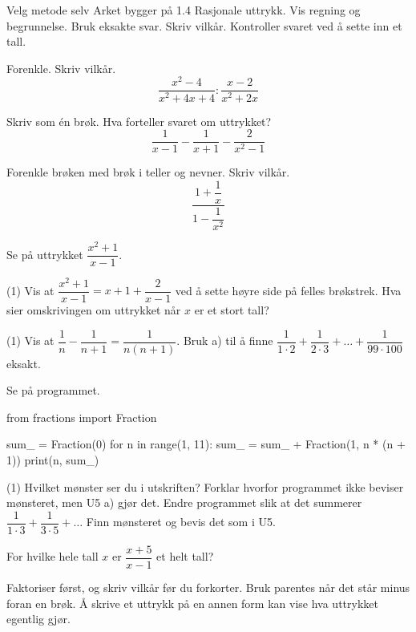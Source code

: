 
\begin{infoboks}{Velg metode selv}
Arket bygger på 1.4 Rasjonale uttrykk. Vis regning og begrunnelse. Bruk eksakte svar.
Skriv vilkår. Kontroller svaret ved å sette inn et tall.
\end{infoboks}


Forenkle. Skriv vilkår.
\[ \frac{x^2-4}{x^2+4x+4} : \frac{x-2}{x^2+2x} \]

Skriv som én brøk. Hva forteller svaret om uttrykket?
\[ \frac{1}{x-1}-\frac{1}{x+1}-\frac{2}{x^2-1} \]

Forenkle brøken med brøk i teller og nevner. Skriv vilkår.
\[ \dfrac{1+\dfrac{1}{x}}{1-\dfrac{1}{x^2}} \]


Se på uttrykket $\dfrac{x^2+1}{x-1}$.
\begin{tasks}(1)
  \task Vis at $\dfrac{x^2+1}{x-1} = x+1+\dfrac{2}{x-1}$ ved å sette høyre side på felles brøkstrek.
  \task Hva sier omskrivingen om uttrykket når $x$ er et stort tall?
\end{tasks}

\begin{tasks}(1)
  \task Vis at $\dfrac{1}{n}-\dfrac{1}{n+1} = \dfrac{1}{n(n+1)}$.
  \task Bruk a) til å finne $\dfrac{1}{1\cdot 2}+\dfrac{1}{2\cdot 3}+\ldots+\dfrac{1}{99\cdot 100}$ eksakt.
\end{tasks}

Se på programmet.
\begin{kode}
from fractions import Fraction

sum_ = Fraction(0)
for n in range(1, 11):
    sum_ = sum_ + Fraction(1, n * (n + 1))
    print(n, sum_)
\end{kode}
\begin{tasks}(1)
  \task Hvilket mønster ser du i utskriften?
  \task Forklar hvorfor programmet ikke beviser mønsteret, men U5 a) gjør det.
  \task Endre programmet slik at det summerer $\dfrac{1}{1\cdot 3}+\dfrac{1}{3\cdot 5}+\ldots$ Finn mønsteret og bevis det som i U5.
\end{tasks}

For hvilke hele tall $x$ er $\dfrac{x+5}{x-1}$ et helt tall?

\begin{oppsummering}
Faktoriser først, og skriv vilkår før du forkorter. Bruk parentes når det står minus foran en brøk.
Å skrive et uttrykk på en annen form kan vise hva uttrykket egentlig gjør.
\end{oppsummering}
